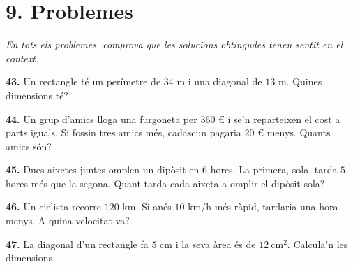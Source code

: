 \documentclass[13pt,a4paper]{extarticle}
\begin{document}
\section*{9. Problemes}

\par\noindent\begin{minipage}{\linewidth}
\emph{\small En tots els problemes, comprova que les solucions obtingudes tenen sentit en el context.}\par
\end{minipage}\par\vspace{1.6mm}
\par\noindent\begin{minipage}{\linewidth}
\textbf{43.} Un rectangle té un perímetre de $34$ m i una diagonal de $13$ m. Quines dimensions té?\par
\end{minipage}\par\vspace{1.6mm}
\par\noindent\begin{minipage}{\linewidth}
\textbf{44.} Un grup d'amics lloga una furgoneta per $360$ € i se'n reparteixen el cost a parts iguals. Si fossin tres amics més, cadascun pagaria $20$ € menys. Quants amics són?\par
\end{minipage}\par\vspace{1.6mm}
\par\noindent\begin{minipage}{\linewidth}
\textbf{45.} Dues aixetes juntes omplen un dipòsit en $6$ hores. La primera, sola, tarda $5$ hores més que la segona. Quant tarda cada aixeta a omplir el dipòsit sola?\par
\end{minipage}\par\vspace{1.6mm}
\par\noindent\begin{minipage}{\linewidth}
\textbf{46.} Un ciclista recorre $120$ km. Si anés $10$ km/h més ràpid, tardaria una hora menys. A quina velocitat va?\par
\end{minipage}\par\vspace{1.6mm}
\par\noindent\begin{minipage}{\linewidth}
\textbf{47.} La diagonal d'un rectangle fa $5$ cm i la seva àrea és de $12\ \text{cm}^2$. Calcula'n les dimensions.\par
\end{minipage}\par\vspace{1.6mm}
\end{document}
